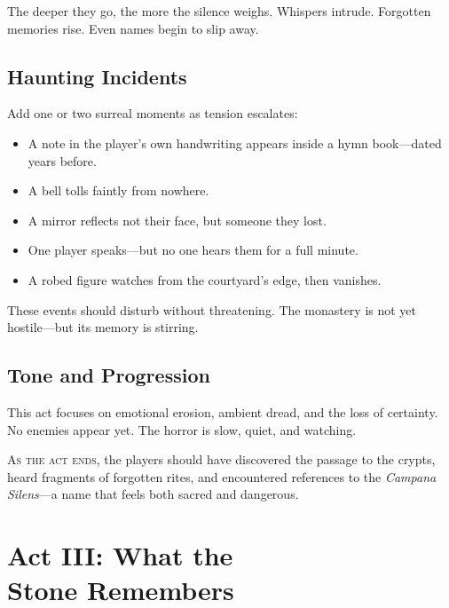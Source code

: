 \vspace{\baselineskip}
The deeper they go, the more the silence weighs. Whispers intrude. Forgotten memories rise. Even names begin to slip away.

\subsection{Haunting Incidents}

Add one or two surreal moments as tension escalates:
\begin{Example}{}
\begin{itemize}
    \item A note in the player’s own handwriting appears inside a hymn book—dated years before.
    \item A bell tolls faintly from nowhere.
    \item A mirror reflects not their face, but someone they lost.
    \item One player speaks—but no one hears them for a full minute.
    \item A robed figure watches from the courtyard's edge, then vanishes.
\end{itemize}
\end{Example}

These events should disturb without threatening. The monastery is not yet hostile—but its memory is stirring.

\subsection{Tone and Progression}

This act focuses on emotional erosion, ambient dread, and the loss of certainty. No enemies appear yet. The horror is slow, quiet, and watching.


\vspace{\baselineskip}\noindent
\textsc{As the act ends}, the players should have discovered the passage to the crypts, heard fragments of forgotten rites, and encountered references to the \emph{Campana Silens}—a name that feels both sacred and dangerous.



\section[Act III: What the Stone Remembers]{Act III: What the\\ Stone Remembers}

